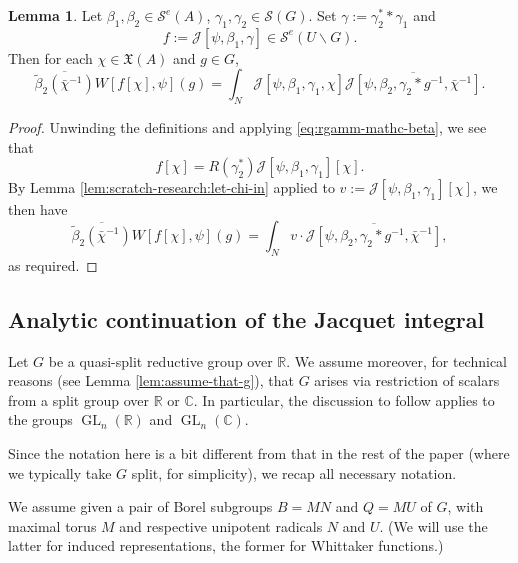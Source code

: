 \documentclass[reqno]{amsart}
\DeclareMathOperator{\GL}{GL}
\theoremstyle{plain} \newtheorem{theorem} {Theorem}
\theoremstyle{definition} \newtheorem{definition} [theorem] {Definition}
\theoremstyle{itplain} %
\newtheorem{lemma}[theorem]{Lemma}
\numberwithin{equation}{section}
\numberwithin{theorem}{section}
\begin{document}
\begin{lemma}\label{lem:scratch-research:let-beta_1-beta_2}
  Let $\beta_1, \beta_2 \in \mathcal{S}^e(A)$, $\gamma_1, \gamma_2 \in \mathcal{S}(G)$.  Set $\gamma := \gamma_2^* \ast \gamma_1$ and
  \begin{equation*}
f := \mathcal{J}[\psi, \beta_1, \gamma] \in \mathcal{S}^e(U \backslash G).
\end{equation*}
 Then for each $\chi \in \mathfrak{X}(A)$ and $g \in G$,
  \begin{equation*}
    \overline{\tilde{\beta}_2(\bar{\chi}^{-1})}
    W[f[\chi], \psi](g)
    =
    \int _{N}
    \mathcal{J}[\psi, \beta_1, \gamma_1, \chi]
    \overline{\mathcal{J}[\psi, \beta_2, \gamma_2 \ast g^{-1}, \bar{\chi}^{-1}]}.
  \end{equation*}
\end{lemma}
\begin{proof}
  Unwinding the definitions and applying \eqref{eq:rgamm-mathc-beta}, we see that
  \begin{equation*}
f[\chi] = R(\gamma_2^*) \mathcal{J}[\psi,\beta_1,\gamma_1][\chi].
\end{equation*}
By Lemma \ref{lem:scratch-research:let-chi-in} applied to $v := \mathcal{J}[\psi,\beta_1,\gamma_1][\chi]$,
  we then have
  \begin{equation*}
    \overline{\tilde{\beta}_2(\bar{\chi}^{-1})}
    W[f[\chi], \psi](g)
    =
    \int_N v \cdot \overline{\mathcal{J}[\psi,\beta_2, \gamma_2 \ast g^{-1}, \bar{\chi}^{-1}]},
  \end{equation*}
  as required.
\end{proof}

\subsection{Analytic continuation of the Jacquet integral}\label{sec:analyt-cont-jacq}
Let $G$ be a quasi-split reductive group over $\mathbb{R}$.  We assume moreover, for technical reasons (see Lemma \ref{lem:assume-that-g}), that $G$ arises via restriction of scalars from a split group over $\mathbb{R}$ or $\mathbb{C}$.  In particular, the discussion to follow applies to the groups $\GL_n(\mathbb{R})$ and $\GL_n(\mathbb{C})$.

Since the notation here is a bit different from that in the rest of the paper (where we typically take $G$ split, for simplicity), we recap all necessary notation.

We assume given a pair of Borel subgroups $B = M N$ and $Q = M U$ of $G$, with maximal torus $M$ and respective unipotent radicals $N$ and $U$.  (We will use the latter for induced representations, the former for Whittaker functions.)
\end{document}
